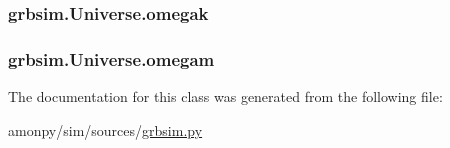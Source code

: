 \hypertarget{classgrbsim_1_1_universe_a70b693aecf5f78246da8652a9f8f8cc9}{
\subsubsection[{omegak}]{\setlength{\rightskip}{0pt plus 5cm}grbsim.\-Universe.\-omegak}}\label{classgrbsim_1_1_universe_a70b693aecf5f78246da8652a9f8f8cc9}
\hypertarget{classgrbsim_1_1_universe_a50a43043c5dd268cba4242c241b730b4}{
\subsubsection[{omegam}]{\setlength{\rightskip}{0pt plus 5cm}grbsim.\-Universe.\-omegam}}\label{classgrbsim_1_1_universe_a50a43043c5dd268cba4242c241b730b4}


The documentation for this class was generated from the following file\-:\begin{DoxyCompactItemize}
\item 
amonpy/sim/sources/\hyperlink{grbsim_8py}{grbsim.\-py}\end{DoxyCompactItemize}

